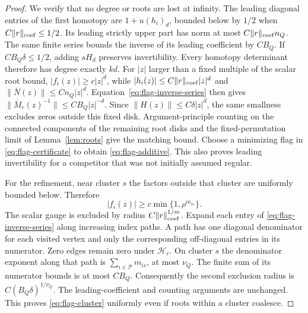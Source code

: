 \begin{proof}
We verify that no degree or roots are lost at infinity. The leading
diagonal entries of the first homotopy are $1+u(h_i)_d$, bounded below
by $1/2$ when $C\|r\|_{\rm coef}\le1/2$. Its leading strictly upper
part has norm at most $C\|r\|_{\rm coef}n_Q$. The same finite series
bounds the inverse of its leading coefficient by $CB_Q$. If
$CB_Q\delta\le1/2$, adding $sH_d$ preserves invertibility. Every
homotopy determinant therefore has degree exactly $kd$.
For $|z|$ larger than a fixed multiple of the scalar root bound,
$|f_i(z)|\ge c|z|^d$, while
$|h_i(z)|\le C\|r\|_{\rm coef}|z|^d$ and
$\|\overline N(z)\|\le Cn_Q|z|^d$.
Equation~\eqref{eq:flag-inverse-series} then gives
$\|\overline M_r(z)^{-1}\|\le CB_Q|z|^{-d}$.
Since $\|H(z)\|\le C\delta|z|^d$, the same smallness excludes zeros
outside this fixed disk. Argument-principle counting on the connected
components of the remaining root disks and the fixed-permutation limit
of Lemma~\ref{lem:roots} give the matching bound. Choose a minimizing
flag in \eqref{eq:flag-certificate} to obtain \eqref{eq:flag-additive}.
This also proves leading invertibility for a competitor that was not
initially assumed regular.

For the refinement, near cluster $s$ the factors outside that cluster
are uniformly bounded below. Therefore
\[
 |f_i(z)|\ge c\min\{1,\rho^{m_{is}}\}.
\]
The scalar gauge is excluded by radius $C\|r\|_{\rm coef}^{1/m}$.
Expand each entry of \eqref{eq:flag-inverse-series} along increasing
index paths. A path has one diagonal denominator for each visited
vertex and only the corresponding off-diagonal entries in its
numerator. Zero edges remain zero under $\mathcal H_r$. On cluster
$s$ the denominator exponent along that path is
$\sum_{i\in\mathcal P}m_{is}$, at most $\nu_Q$.
The finite sum of its numerator bounds is at most $CB_Q$.
Consequently the second exclusion radius is $C(B_Q\delta)^{1/\nu_Q}$.
The leading-coefficient and counting arguments are unchanged. This
proves \eqref{eq:flag-cluster} uniformly even if roots within a cluster
coalesce.
\end{proof}

